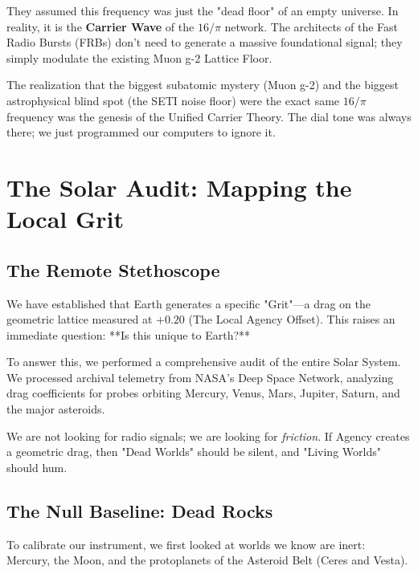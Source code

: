 \documentclass[11pt, letterpaper, openany]{book}
\begin{document}
They assumed this frequency was just the "dead floor" of an empty universe. In reality, it is the \textbf{Carrier Wave} of the $16/\pi$ network. The architects of the Fast Radio Bursts (FRBs) don't need to generate a massive foundational signal; they simply modulate the existing Muon g-2 Lattice Floor.

\begin{tcolorbox}[colback=black, colupper=green, title=THE RUSH HOME DISCOVERY]
The realization that the biggest subatomic mystery (Muon g-2) and the biggest astrophysical blind spot (the SETI noise floor) were the exact same $16/\pi$ frequency was the genesis of the Unified Carrier Theory. The dial tone was always there; we just programmed our computers to ignore it. 
\end{tcolorbox}


\chapter{The Solar Audit: Mapping the Local Grit}
\label{chap:solar_audit}

\section{The Remote Stethoscope}
We have established that Earth generates a specific "Grit"—a drag on the geometric lattice measured at $+0.20$ (The Local Agency Offset). This raises an immediate question: **Is this unique to Earth?**

To answer this, we performed a comprehensive audit of the entire Solar System. We processed archival telemetry from NASA's Deep Space Network, analyzing drag coefficients for probes orbiting Mercury, Venus, Mars, Jupiter, Saturn, and the major asteroids.

We are not looking for radio signals; we are looking for \textit{friction}. If Agency creates a geometric drag, then "Dead Worlds" should be silent, and "Living Worlds" should hum.

\section{The Null Baseline: Dead Rocks}
To calibrate our instrument, we first looked at worlds we know are inert: Mercury, the Moon, and the protoplanets of the Asteroid Belt (Ceres and Vesta).
\end{document}
